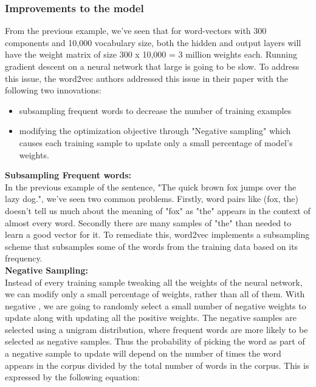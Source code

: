 \subsubsection{Improvements to the model}

From the previous example, we've seen that for word-vectors with 300 components and 10,000 vocabulary size, both the hidden and output layers will have the weight matrix of size 300 x 10,000 = 3 million weights each. Running gradient descent on a neural network that large is going to be slow. To address this issue, the word2vec authors addressed this issue in their paper with the following two innovations:

\begin{itemize}
\item{subsampling frequent words to decrease the number of training examples}
\item{modifying the optimization objective through "Negative sampling" which causes each training sample to update only a small percentage of model's weights.}\\
\end{itemize}
\noindent\textbf{Subsampling Frequent words:}\\

In the previous example of the sentence, "The quick brown fox jumps over the lazy dog.", we've seen two common problems. Firstly, word pairs like (fox, the) doesn't tell us much about the meaning of "fox" as "the" appears in the context of almost every word. Secondly there are many samples of "the" than needed to learn a good vector for it. To remediate this, word2vec implements a subsampling scheme that subsamples some of the words from the training data based on its frequency.\\

\noindent\textbf{Negative Sampling:}\\

Instead of every training sample tweaking all the weights of the neural network, we can modify only a small percentage of weights, rather than all of them. With negative \cite{goldberg2014word2vec}, we are going to randomly select a small number of negative weights to update along with updating all the positive weights. The negative samples are selected using a unigram distribution, where frequent words are more likely to be selected as negative samples. Thus the probability of picking the word as part of a negative sample to update will depend on the number of times the word appears in the corpus divided by the total number of words in the corpus. This is expressed by the following equation:

